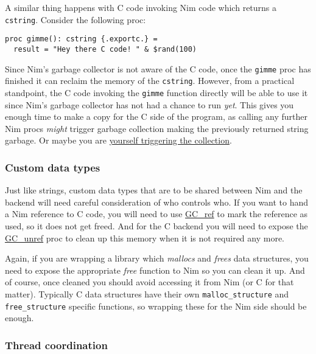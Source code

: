 A similar thing happens with C code invoking Nim code which returns a
\texttt{cstring}. Consider the following proc:

\begin{verbatim}
proc gimme(): cstring {.exportc.} =
  result = "Hey there C code! " & $rand(100)
\end{verbatim}

Since Nim's garbage collector is not aware of the C code, once the
\texttt{gimme} proc has finished it can reclaim the memory of the
\texttt{cstring}. However, from a practical standpoint, the C code
invoking the \texttt{gimme} function directly will be able to use it
since Nim's garbage collector has not had a chance to run \emph{yet}.
This gives you enough time to make a copy for the C side of the program,
as calling any further Nim procs \emph{might} trigger garbage collection
making the previously returned string garbage. Or maybe you are
\href{gc.html}{yourself triggering the collection}.

\hypertarget{custom-data-types}{%
\subsubsection{Custom data types}\label{custom-data-types}}

Just like strings, custom data types that are to be shared between Nim
and the backend will need careful consideration of who controls who. If
you want to hand a Nim reference to C code, you will need to use
\href{system.html\#GC_ref,ref.T}{GC\_ref} to mark the reference as used,
so it does not get freed. And for the C backend you will need to expose
the \href{system.html\#GC_unref,ref.T}{GC\_unref} proc to clean up this
memory when it is not required any more.

Again, if you are wrapping a library which \emph{mallocs} and
\emph{frees} data structures, you need to expose the appropriate
\emph{free} function to Nim so you can clean it up. And of course, once
cleaned you should avoid accessing it from Nim (or C for that matter).
Typically C data structures have their own \texttt{malloc\_structure}
and \texttt{free\_structure} specific functions, so wrapping these for
the Nim side should be enough.

\hypertarget{thread-coordination}{%
\subsubsection{Thread coordination}\label{thread-coordination}}

